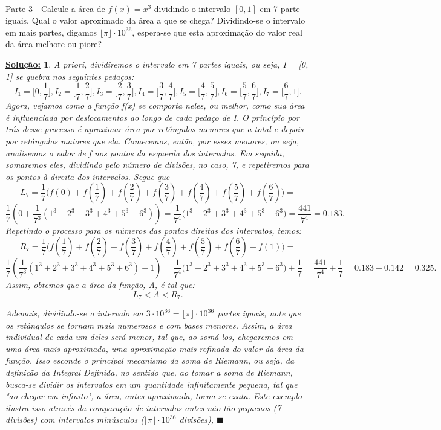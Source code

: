 \documentclass{article}
\newtheorem*{sol*}{\underline{Solu\c c\~ao:}}
\renewcommand\qedsymbol{$\blacksquare$}
\begin{document}
\paragraph{} Parte 3 - Calcule a \'area de $f(x) = x^3$ dividindo o intervalo $[0, 1]$ em 7 parte iguais. Qual o valor aproximado da \'area a que se chega? Dividindo-se o intervalo em mais partes, digamos $\lfloor{\pi}\rfloor\cdot{10^{36}}$, espera-se que esta aproxima\c c\~ao do valor real da \'area melhore ou piore?
\begin{sol*}
A priori, dividiremos o intervalo em 7 partes iguais, ou seja, I = [0, 1] se quebra nos seguintes peda\c cos:
$$
I_1 = \biggl[0, \frac{1}{7}\biggr],     I_2 = \biggl[\frac{1}{7}, \frac{2}{7}\biggr],       I_3 = \biggl[\frac{2}{7}, \frac{3}{7}\biggr],    I_4 = \biggl[\frac{3}{7}, \frac{4}{7}\biggr],    I_5 = \biggl[\frac{4}{7}, \frac{5}{7}\biggr], I_6 = \biggl[\frac{5}{7}, \frac{6}{7}\biggr], I_7 = \biggl[\frac{6}{7}, 1\biggr].
$$
Agora, vejamos como a fun\c c\~ao f(x) se comporta neles, ou melhor, como sua \'area \'e influenciada por deslocamentos ao longo de cada peda\c co de I. O princ\'ipio por tr\'as desse processo \'e aproximar \'area por ret\^angulos menores que a total e depois por ret\^angulos maiores que ela. Comecemos, ent\~ao, por esses menores, ou seja, analisemos o valor de f nos pontos da esquerda dos intervalos. Em seguida, somaremos eles, dividindo pelo n\'umero de divis\~oes, no caso, 7, e repetiremos para os pontos \`a direita dos intervalos. Segue que 
$$
L_7 = \frac{1}{7}\biggl(f(0) + f(\frac{1}{7}) + f(\frac{2}{7}) + f(\frac{3}{7}) + f(\frac{4}{7}) + f(\frac{5}{7}) + f(\frac{6}{7})\biggr) =
$$
$$
\frac{1}{7}(0 + \frac{1}{7^3}(1^3 + 2^3 + 3^3 + 4^3 + 5^3 + 6^3)) = \frac{1}{7^4}\biggl(1^3 + 2^3 + 3^3 + 4^3 + 5^3 + 6^3\biggr) = \frac{441}{7^4}
= 0.183.$$
Repetindo o processo para os n\'umeros das pontas direitas dos intervalos, temos:
$$
R_7 = \frac{1}{7}\biggl(f(\frac{1}{7}) + f(\frac{2}{7}) + f(\frac{3}{7}) + f(\frac{4}{7}) + f(\frac{5}{7}) + f(\frac{6}{7}) + f(1)\biggr) =
$$
$$
\frac{1}{7}(\frac{1}{7^3}(1^3 + 2^3 + 3^3 + 4^3 + 5^3 + 6^3) + 1) = \frac{1}{7^4}\biggl(1^3 + 2^3 + 3^3 + 4^3 + 5^3 + 6^3\biggr) + \frac{1}{7} = \frac{441}{7^4} + \frac{1}{7}= 0.183 + 0.142 = 0.325.
$$
Assim, obtemos que a \'area da fun\c c\~ao, A, \'e tal que:
$$
L_7 < A < R_7.
$$
	\par{}Ademais, dividindo-se o intervalo em $3\cdot{10^{36}} = \lfloor{\pi}\rfloor\cdot{10^{36}}$ partes iguais, note que os ret\^angulos se tornam mais numerosos e com bases menores. Assim, a \'area individual de cada um deles ser\'a menor, tal que, ao som\'a-los, chegaremos em uma \'area mais aproximada, uma aproxima\c c\~ao mais refinada do valor da \'area da fun\c c\~ao. Isso esconde o principal mecanismo da soma de Riemann, ou seja, da defini\c c\~ao da Integral Definida, no sentido que, ao tomar a soma de Riemann, busca-se dividir os intervalos em um quantidade infinitamente pequena, tal que "ao chegar em infinito", a \'area, antes aproximada, torna-se exata. Este exemplo ilustra isso atrav\'es da compara\c c\~ao de intervalos antes n\~ao t\~ao pequenos (7 divis\~oes) com intervalos min\'usculos ($\lfloor{\pi}\rfloor\cdot{10}^{36}$ divis\~oes),
\qedsymbol
\end{sol*}
\end{document}
